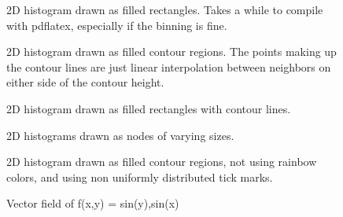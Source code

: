 \documentclass{article}
\begin{document}
\begin{figure}[H]
\centering

\captionsetup{singlelinecheck=off}
\caption[asdf]{2D histogram drawn as filled rectangles. Takes a while to compile with pdflatex, 
especially if the binning is fine.}
\end{figure}
\begin{figure}[H]
\centering

\captionsetup{singlelinecheck=off}
\caption[asdf]{2D histogram drawn as filled contour regions. The points making up the contour lines 
are just linear interpolation between neighbors on either side of the contour height.}
\end{figure}
\begin{figure}[H]
\centering

\captionsetup{singlelinecheck=off}
\caption[asdf]{2D histogram drawn as filled rectangles with contour lines.}
\end{figure}
\begin{figure}[H]
\centering

\captionsetup{singlelinecheck=off}
\caption[asdf]{2D histograms drawn as nodes of varying sizes.}
\end{figure}
\begin{figure}[H]
\centering

\captionsetup{singlelinecheck=off}
\caption[asdf]{2D histogram drawn as filled contour regions, not using rainbow colors, and using
non uniformly distributed tick marks.}
\end{figure}
\begin{figure}[H]
\centering

\captionsetup{singlelinecheck=off}
\caption[asdf]{Vector field of f(x,y) = sin(y),sin(x)}
\end{figure}
\end{document}
